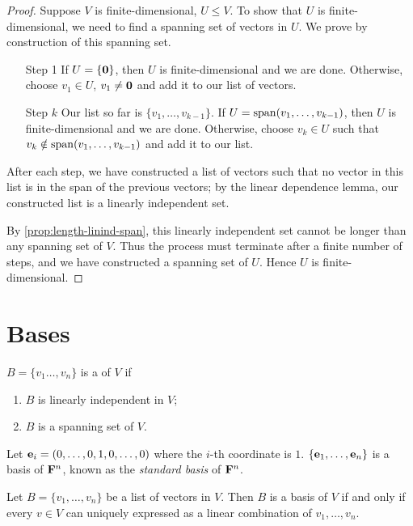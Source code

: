\begin{proof}
Suppose $V$ is finite-dimensional, $U\le V$. To show that $U$ is finite-dimensional, we need to find a spanning set of vectors in $U$. We prove by construction of this spanning set.

\begin{enumerate}
\item[Step 1] If $U=\{\vb{0}\}$, then $U$ is finite-dimensional and we are done. Otherwise, choose $v_1\in U$, $v_1\neq\vb{0}$ and add it to our list of vectors.
\item[Step $k$] Our list so far is $\{v_1,\dots,v_{k-1}\}$. If $U=\operatorname{span}(v_1,\dots,v_{k-1})$, then $U$ is finite-dimensional and we are done. Otherwise, choose $v_k\in U$ such that $v_k\notin\operatorname{span}(v_1,\dots,v_{k-1})$ and add it to our list.
\end{enumerate}

After each step, we have constructed a list of vectors such that no vector in this list is in the span of the previous vectors; by the linear dependence lemma, our constructed list is a linearly independent set.

By \cref{prop:length-linind-span}, this linearly independent set cannot be longer than any spanning set of $V$. Thus the process must terminate after a finite number of steps, and we have constructed a spanning set of $U$. Hence $U$ is finite-dimensional.
\end{proof}
\pagebreak

\section{Bases}
\begin{definition}[Basis]
$B=\{v_1\dots,v_n\}$ is a  of $V$ if
\begin{enumerate}[label=(\roman*)]
\item $B$ is linearly independent in $V$;
\item $B$ is a spanning set of $V$.
\end{enumerate}
\end{definition}

\begin{example}
Let $\vb{e}_i=(0,\dots,0,1,0,\dots,0)$ where the $i$-th coordinate is $1$. $\{\vb{e}_1,\dots,\vb{e}_n\}$ is a basis of $\mathbf F^n$, known as the \emph{standard basis} of $\mathbf F^n$.
\end{example}

\begin{lemma}\label{lemma:basis-criterion}
Let $B=\{v_1,\dots,v_n\}$ be a list of vectors in $V$. Then $B$ is a basis of $V$ if and only if every $v\in V$ can uniquely expressed as a linear combination of $v_1,\dots,v_n$.
\end{lemma}

